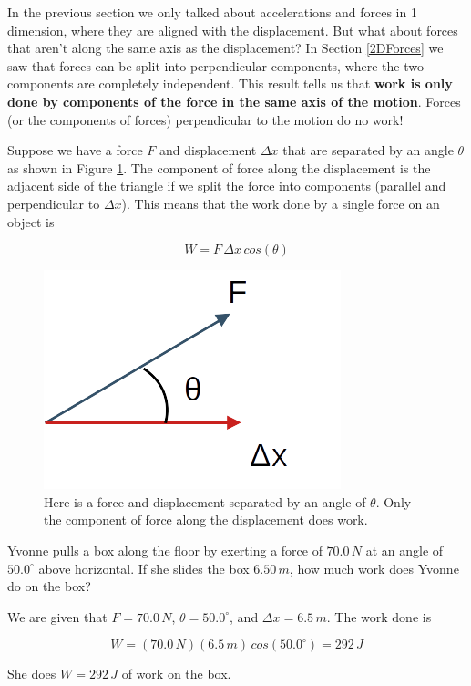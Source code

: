\documentclass[12pt]{book}
\begin{document}
In the previous section we only talked about accelerations and forces in 1 dimension, where they are aligned with the displacement. But what about forces that aren't along the same axis as the displacement? In Section \ref{2DForces} we saw that forces can be split into perpendicular components, where the two components are completely independent. This result tells us that \textbf{work is only done by components of the force in the same axis of the motion}. Forces (or the components of forces) perpendicular to the motion do no work!



Suppose we have a force $F$ and displacement $\Delta x$ that are separated by an angle $\theta$ as shown in Figure \ref{work_angle}. The component of force along the displacement is the adjacent side of the triangle if we split the force into components (parallel and perpendicular to $\Delta x$). This means that the work done by a single force on an object is

\begin{equation}
W = F \, \Delta x \, cos(\theta)
\label{workdef}
\end{equation}

\begin{figure}[H]
\centering
\includegraphics[scale=0.4]{work_angle.png}
\caption{Here is a force and displacement separated by an angle of $\theta$. Only the component of force along the displacement does work.}
\label{work_angle}
\end{figure}

\begin{exampleblock}

Yvonne pulls a box along the floor by exerting a force of $70.0 \, N$ at an angle of $50.0^{\circ}$ above horizontal. If she slides the box $6.50 \, m$, how much work does Yvonne do on the box?

\hspace{10pt}

We are given that $F = 70.0 \, N$, $\theta = 50.0^{\circ}$, and $\Delta x = 6.5 \, m$. The work done is

\begin{equation}
W = (70.0 \, N) (6.5 \, m) \, cos(50.0^{\circ}) = 292 \, J
\end{equation}

She does $W = 292 \, J$ of work on the box.

\end{exampleblock}
\end{document}
